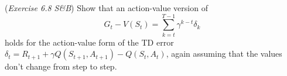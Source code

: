 (\textit{Exercise 6.8 S\&B})
Show that an action-value version of
$$G_{t} - V(S_{t}) = \sum_{k=t}^{T-1}\gamma^{k-t}\delta_{k}$$
holds for the action-value form of the TD error
$\delta_t = R_{t+1} + \gamma Q(S_{t+1}, A_{t+1}) -Q(S_{t}, A_{t})$,
again assuming that the values don’t change from step to step.

